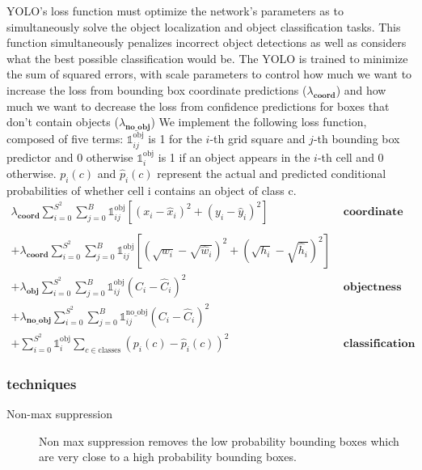\documentclass[a4paper]{article}
\begin{document}
YOLO’s loss function must optimize the network's parameters as to simultaneously solve the object localization and object classification tasks. This function
simultaneously penalizes incorrect object detections
as well as considers what the best possible classification
would be. The YOLO is trained to minimize the sum of squared errors, with scale parameters to control how much we want to increase the loss from bounding box coordinate predictions ($\lambda_\textbf{coord}$) and how much we want to decrease the loss from confidence predictions for boxes that don’t contain objects ($\lambda_\textbf{no\_obj}$) We
implement the following loss function, composed of five
terms:
${\mathbb{1}}_{ij}^{\text{obj}}$ is 1 for the $i$-th grid square and $j$-th bounding box predictor and 0 otherwise ${{\mathbb{1}}}_i^{\text{obj}}$ is 1 if an object appears in the $i$-th cell and 0 otherwise.
$p_i(c)$ and $\hat{p}_i(c)$ represent the actual and predicted conditional probabilities of whether cell i contains an object of class c.
\begin{align*}
\lambda_\textbf{coord}
\sum_{i = 0}^{S^2}
    \sum_{j = 0}^{B}
     {\mathbb{1}}_{ij}^{\text{obj}}
            \left[
            \left(
                x_i - \hat{x}_i
            \right)^2 +
            \left(
                y_i - \hat{y}_i
            \right)^2
            \right]&\textbf{\ coordinate loss}
\\\\
+ \lambda_\textbf{coord} 
\sum_{i = 0}^{S^2}
    \sum_{j = 0}^{B}
         {\mathbb{1}}_{ij}^{\text{obj}}
         \left[
        \left(
            \sqrt{w_i} - \sqrt{\hat{w}_i}
        \right)^2 +
        \left(
            \sqrt{h_i} - \sqrt{\hat{h}_i}
        \right)^2
        \right]\\
+ \lambda_\textbf{obj}\sum_{i = 0}^{S^2}
    \sum_{j = 0}^{B}
        {\mathbb{1}}_{ij}^{\text{obj}}
        \left(
            C_i - \hat{C}_i
        \right)^2&\textbf{\ objectness loss}
\\
+ \lambda_\textbf{no\_obj}
\sum_{i = 0}^{S^2}
    \sum_{j = 0}^{B}
    {\mathbb{1}}_{ij}^{\text{no\_obj}}
        \left(
            C_i - \hat{C}_i
        \right)^2\\ 
+ \sum_{i = 0}^{S^2}
{{\mathbb{1}}}_i^{\text{obj}}
    \sum_{c \in \textrm{classes}}
        \left(
            p_i(c) - \hat{p}_i(c)
        \right)^2&\textbf{\ classification loss}
\end{align*}


\subsubsection*{techniques}
\begin{description}
\item[Non-max suppression] Non max suppression removes the low probability bounding boxes which are very close to a high probability bounding boxes.
\end{description}
\end{document}
